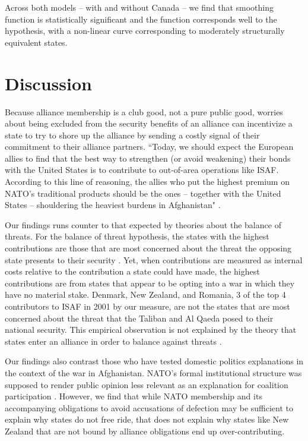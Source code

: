 \documentclass[12pt,letterpaper]{article}
\begin{document}
\begin{figure}[ht]
\begin{minipage}{.5\textwidth}
			\label{fig:test2}
		\end{minipage}
	\end{figure}
	
	Across both models -- with and without Canada -- we find that smoothing function is statistically significant and the function corresponds well to the hypothesis, with a non-linear curve corresponding to moderately structurally equivalent states.

\section{Discussion}
	Because alliance membership is a club good, not a pure public good, worries about being excluded from the security benefits of an alliance can incentivize a state to try to shore up the alliance by sending a costly signal of their commitment to their alliance partners. ``Today, we should expect the European allies to find that the best way to strengthen (or avoid weakening) their bonds with the United States is to contribute to out-of-area operations like ISAF. According to this line of reasoning, the allies who put the highest premium on NATO’s traditional products should be the ones – together with the United States – shouldering the heaviest burdens in Afghanistan" \citep{ringsmose_natoburdensharingredux_2010}.

	Our findings runs counter to that expected by theories about the balance of threats. For the balance of threat hypothesis, the states with the highest contributions are those that are most concerned about the threat the opposing state presents to their security \citep{haesebrouck_democraticparticipationair_2016}. Yet, when contributions are measured as internal costs relative to the contribution a state could have made, the highest contributions are from states that appear to be opting into a war in which they have no material stake. Denmark, New Zealand, and Romania, 3 of the top 4 contributors to ISAF in 2001 by our measure, are not the states that are most concerned about the threat that the Taliban and Al Qaeda posed to their national security. This empirical observation is not explained by the theory that states enter an alliance in order to balance against threats \citep{walt_originsalliance_1987}.

	Our findings also contrast those who have tested domestic politics explanations in the context of the war in Afghanistan. NATO's formal institutional structure was supposed to render public opinion less relevant as an explanation for coalition participation \citep{kreps_eliteconsensusdeterminant_2010}. However, we find that while NATO membership and its accompanying obligations to avoid accusations of defection may be sufficient to explain why states do not free ride, that does not explain why states like New Zealand that are not bound by alliance obligations end up over-contributing.
\end{document}
